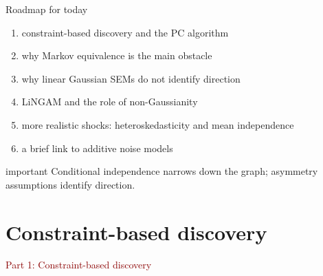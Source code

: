 \documentclass[dvipsnames,aspectratio=169,handout]{beamer}
\begin{document}
\begin{frame}{Roadmap for today}
\begin{enumerate}
    \item constraint-based discovery and the PC algorithm
    \item why Markov equivalence is the main obstacle
    \item why linear Gaussian SEMs do not identify direction
    \item LiNGAM and the role of non-Gaussianity
    \item more realistic shocks: heteroskedasticity and mean independence
    \item a brief link to additive noise models
\end{enumerate}

\vspace{2mm}
\begin{beamercolorbox}[wd=\textwidth,sep=7pt,center,rounded=true,shadow=true]{important}
Conditional independence narrows down the graph; asymmetry assumptions identify direction.
\end{beamercolorbox}
\end{frame}


\section{Constraint-based discovery}

\begin{frame}{}
\begin{center}
{\Huge \textcolor{DarkRed}{Part 1: Constraint-based discovery}}
\end{center}
\end{frame}
\end{document}
